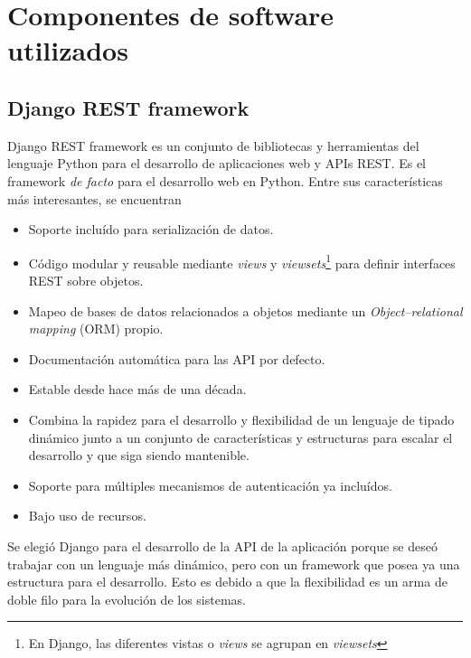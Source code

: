 \section{Componentes de software utilizados}

\subsection{Django REST framework}

Django REST framework es un conjunto de bibliotecas y herramientas del lenguaje Python para el desarrollo de aplicaciones web y APIs REST. Es el framework \textit{de facto} para el desarrollo web en Python. Entre sus características más interesantes, se encuentran\citep{DJANGO:1}
\begin{itemize}
	\item Soporte incluído para serialización de datos.
	\item Código modular y reusable mediante \textit{views} y \textit{viewsets}\footnote{En Django, las diferentes vistas o \textit{views} se agrupan en \textit{viewsets}} para definir interfaces REST sobre objetos.
	\item Mapeo de bases de datos relacionados a objetos mediante un \textit{Object–relational mapping} (ORM) propio.
	\item Documentación automática para las API por defecto.
	\item Estable desde hace más de una década.
	\item Combina la rapidez para el desarrollo y flexibilidad de un lenguaje de tipado dinámico junto a un conjunto de características y estructuras para escalar el desarrollo y que siga siendo mantenible.
	\item Soporte para múltiples mecanismos de autenticación ya incluídos.
	\item Bajo uso de recursos.
\end{itemize}

Se elegió Django para el desarrollo de la API de la aplicación porque se deseó trabajar con un lenguaje más dinámico, pero con un framework que posea ya una estructura para el desarrollo. Esto es debido a que la flexibilidad es un arma de doble filo para la evolución de los sistemas.

